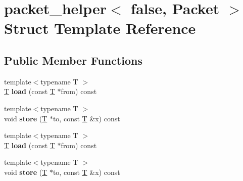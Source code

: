 \hypertarget{structpacket__helper_3_01false_00_01_packet_01_4}{}\section{packet\+\_\+helper$<$ false, Packet $>$ Struct Template Reference}
\label{structpacket__helper_3_01false_00_01_packet_01_4}
\subsection*{Public Member Functions}
\begin{DoxyCompactItemize}
\item 
\mbox{\label{structpacket__helper_3_01false_00_01_packet_01_4_a616094d055666e5255f794959e87844e}} 
{\footnotesize template$<$typename T $>$ }\\\hyperlink{group___sparse_core___module}{T} {\bfseries load} (const \hyperlink{group___sparse_core___module}{T} $\ast$from) const
\item 
\mbox{\label{structpacket__helper_3_01false_00_01_packet_01_4_a909d7e27ae9c9ac39215e3825f2ac6a7}} 
{\footnotesize template$<$typename T $>$ }\\void {\bfseries store} (\hyperlink{group___sparse_core___module}{T} $\ast$to, const \hyperlink{group___sparse_core___module}{T} \&x) const
\item 
\mbox{\label{structpacket__helper_3_01false_00_01_packet_01_4_a616094d055666e5255f794959e87844e}} 
{\footnotesize template$<$typename T $>$ }\\\hyperlink{group___sparse_core___module}{T} {\bfseries load} (const \hyperlink{group___sparse_core___module}{T} $\ast$from) const
\item 
\mbox{\label{structpacket__helper_3_01false_00_01_packet_01_4_a909d7e27ae9c9ac39215e3825f2ac6a7}} 
{\footnotesize template$<$typename T $>$ }\\void {\bfseries store} (\hyperlink{group___sparse_core___module}{T} $\ast$to, const \hyperlink{group___sparse_core___module}{T} \&x) const
\end{DoxyCompactItemize}


